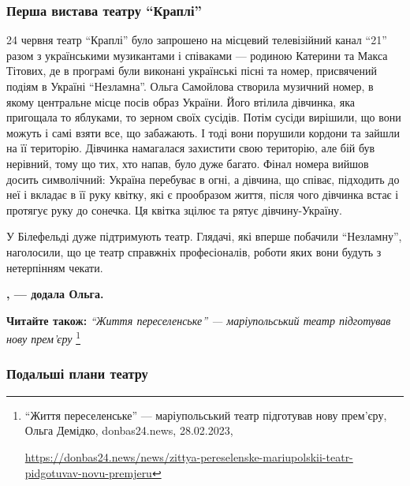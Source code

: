 \subsubsection{Перша вистава театру \enquote{Краплі}}

24 червня театр \enquote{Краплі} було запрошено на місцевий телевізійний канал \enquote{21}
разом з українськими музикантами і співаками — родиною Катерини та Макса
Тітових, де в програмі були виконані українські пісні та номер, присвячений
подіям в Україні \enquote{Незламна}. Ольга Самойлова створила музичний номер, в якому
центральне місце посів образ України. Його втілила дівчинка, яка пригощала то
яблуками, то зерном своїх сусідів. Потім сусіди вирішили, що вони можуть і самі
взяти все, що забажають. І тоді вони порушили кордони та зайшли на її
територію. Дівчинка намагалася захистити свою територію, але бій був нерівний,
тому що тих, хто напав, було дуже багато. Фінал номера вийшов досить
символічний: Україна перебуває в огні, а дівчина, що співає, підходить до неї і
вкладає в її руку квітку, які є прообразом життя, після чого дівчинка встає і
протягує руку до сонечка. Ця квітка зцілює та рятує дівчину-Україну.

У Білефельді дуже підтримують театр. Глядачі, які вперше побачили \enquote{Незламну},
наголосили, що це театр справжніх професіоналів, роботи яких вони будуть з
нетерпінням чекати.

\begin{leftbar}
	\begingroup
		\bfseries
{}, — додала Ольга. 
	\endgroup
\end{leftbar}

\textbf{Читайте також:} \emph{\enquote{Життя переселенське} — маріупольський театр підготував нову прем'єру}%
\footnote{\enquote{Життя переселенське} — маріупольський театр підготував нову прем'єру, Ольга Демідко, donbas24.news, 28.02.2023, \par%
\url{https://donbas24.news/news/zittya-pereselenske-mariupolskii-teatr-pidgotuvav-novu-premjeru}%
}


\subsubsection{Подальші плани театру}

